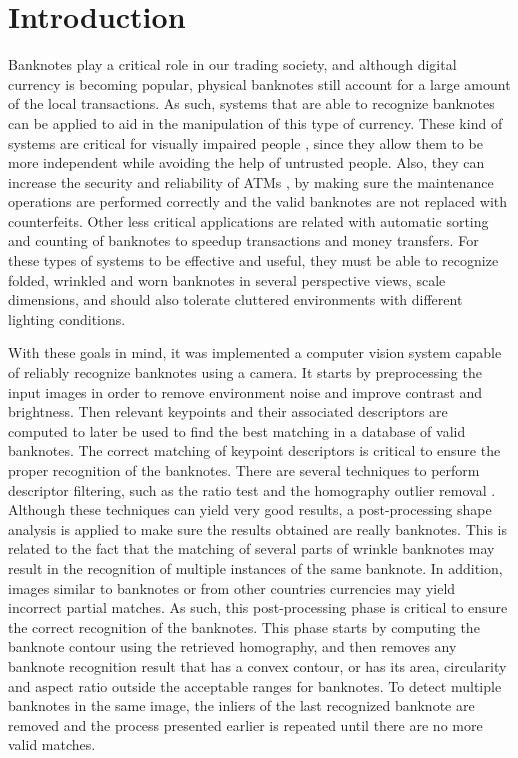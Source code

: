 \section{Introduction}\label{sec:introduction}

Banknotes play a critical role in our trading society, and although digital currency is becoming popular, physical banknotes still account for a large amount of the local transactions. As such, systems that are able to recognize banknotes can be applied to aid in the manipulation of this type of currency. These kind of systems are critical for visually impaired people \cite{Hasanuzzaman2012}, since they allow them to be more independent while avoiding the help of untrusted people. Also, they can increase the security and reliability of ATMs \cite{Sako2007}, by making sure the maintenance operations are performed correctly and the valid banknotes are not replaced with counterfeits. Other less critical applications are related with automatic sorting and counting of banknotes to speedup transactions and money transfers. For these types of systems to be effective and useful, they must be able to recognize folded, wrinkled and worn banknotes in several perspective views, scale dimensions, and should also tolerate cluttered environments with different lighting conditions.

With these goals in mind, it was implemented a computer vision system capable of reliably recognize banknotes using a camera. It starts by preprocessing the input images in order to remove environment noise and improve contrast and brightness. Then relevant keypoints and their associated descriptors are computed to later be used to find the best matching in a database of valid banknotes. The correct matching of keypoint descriptors is critical to ensure the proper recognition of the banknotes. There are several techniques to perform descriptor filtering, such as the ratio test \cite{Lowe2004} and the homography outlier removal \cite{Baggio2012}. Although these techniques can yield very good results, a post-processing shape analysis is applied to make sure the results obtained are really banknotes. This is related to the fact that the matching of several parts of wrinkle banknotes may result in the recognition of multiple instances of the same banknote. In addition, images similar to banknotes or from other countries currencies may yield incorrect partial matches. As such, this post-processing phase is critical to ensure the correct recognition of the banknotes. This phase starts by computing the banknote contour using the retrieved homography, and then removes any banknote recognition result that has a convex contour, or has its area, circularity and aspect ratio outside the acceptable ranges for banknotes. To detect multiple banknotes in the same image, the inliers of the last recognized banknote are removed and the process presented earlier is repeated until there are no more valid matches.

